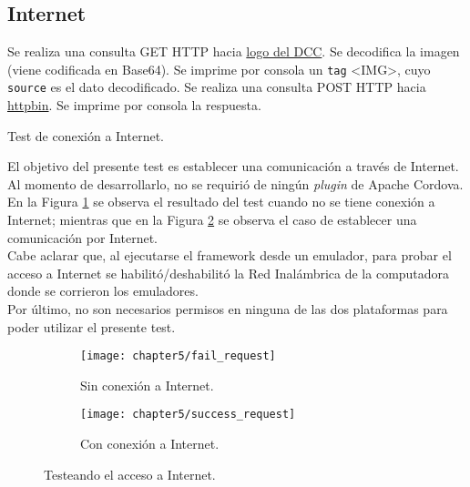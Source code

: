 \subsection{Internet}
\begin{algorithm}
	\begin{algorithmic}[1]
		\STATE Se realiza una consulta GET HTTP hacia \href{https://dcc.fceia.unr.edu.ar/sites/all/themes/birthofcool/images/logo-lcc.png}{logo del DCC}.
		\STATE Se decodifica la imagen (viene codificada en Base64).
		\STATE Se imprime por consola un \texttt{tag} \textless IMG\textgreater, cuyo \texttt{source} es el dato decodificado.
		\STATE Se realiza una consulta POST HTTP hacia \href{http://httpbin.org/post}{httpbin}.
		\STATE Se imprime por consola la respuesta.
	\end{algorithmic}
	\caption{Test de conexión a Internet.}\label{alg:chap5_test_internet}
\end{algorithm}
El objetivo del presente test es establecer una comunicación a través de Internet. Al momento de desarrollarlo, no se requirió de ningún \textit{plugin} de Apache Cordova.\\

En la Figura \ref{fig:ch05:fail_request} se observa el resultado del test cuando no se tiene conexión a Internet; mientras que en la Figura \ref{fig:ch05:success_request} se observa el caso de establecer una comunicación por Internet.\\

Cabe aclarar que, al ejecutarse el framework desde un emulador, para probar el acceso a Internet se habilitó/deshabilitó la Red Inalámbrica de la computadora donde se corrieron los emuladores.\\

Por último, no son necesarios permisos en ninguna de las dos plataformas para poder utilizar el presente test.
\begin{figure}[htp]
    \centering
    \begin{subfigure}{.35\linewidth}
		\texttt{[image: chapter5/fail\_request]}
		\caption{Sin conexión a Internet.}
		\label{fig:ch05:fail_request}
	\end{subfigure}
	\begin{subfigure}{.35\linewidth}
		\texttt{[image: chapter5/success\_request]}
		\caption{Con conexión a Internet.}
		\label{fig:ch05:success_request}
	\end{subfigure}
	\caption{Testeando el acceso a Internet.}
	\label{fig:ch05:internet_test}
\end{figure}
